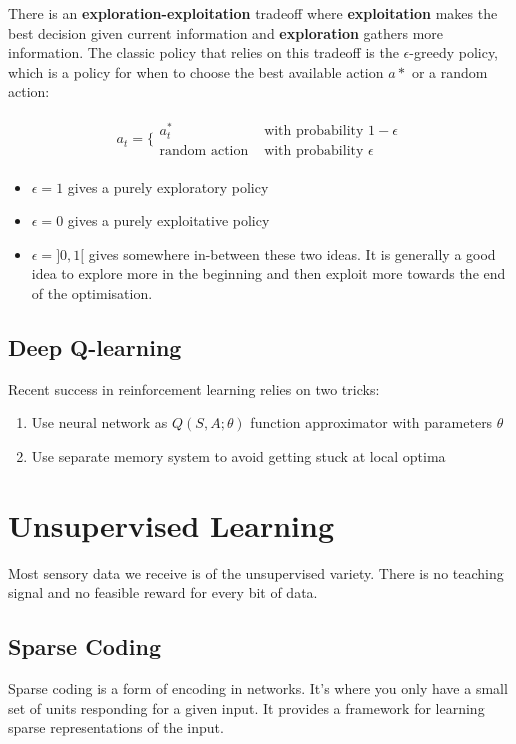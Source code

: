\documentclass[11pt,a4paper,titlepage,dvipsnames,cmyk]{scrartcl}
\begin{document}
There is an \textbf{exploration-exploitation} tradeoff where \textbf{exploitation} makes the best decision given current information and \textbf{exploration} gathers more information. The classic policy that relies on this tradeoff is the $\epsilon$-greedy policy, which is a policy for when to choose the best available action $a*$ or a random action:

\begin{align*}
a_t = \bigg \{
\begin{matrix} 
    a_t^*                  & \text{with probability } 1 - \epsilon \\
    \text{random action } & \text{with probability } \epsilon
\end{matrix}
\end{align*}

\begin{itemize}
    \item $\epsilon=1$ gives a purely exploratory policy
    \item $\epsilon=0$ gives a purely exploitative policy
    \item $\epsilon=]0,1[$ gives somewhere in-between these two ideas. It is generally a good idea to explore more in the beginning and then exploit more towards the end of the optimisation.
\end{itemize}

\subsection{Deep Q-learning}
Recent success in reinforcement learning relies on two tricks:
\begin{enumerate}
\item Use neural network as $Q(S,A;\theta)$ function approximator with parameters $\theta$
\item Use separate memory system to avoid getting stuck at local optima
\end{enumerate}

\section{Unsupervised Learning}
Most sensory data we receive is of the unsupervised variety. There is no teaching signal and no feasible reward for every bit of data.

\subsection{Sparse Coding}
Sparse coding is a form of encoding in networks. It's where you only have a small set of units responding for a given input. It provides a framework for learning sparse representations of the input.
\end{document}
